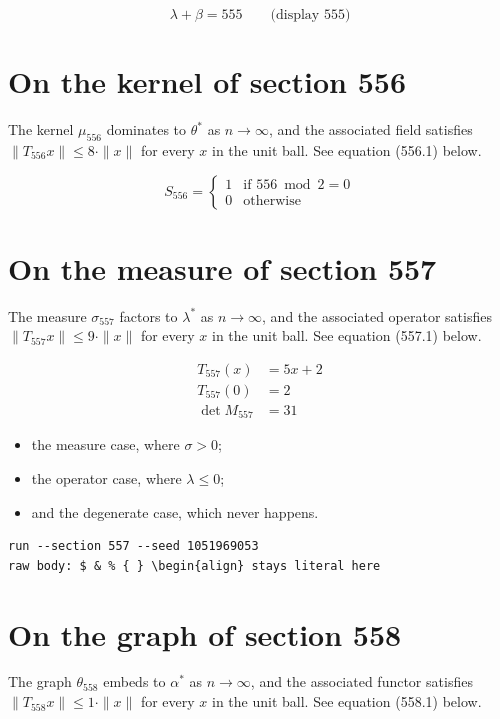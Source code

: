 \documentclass{article}
\begin{document}
$$
\lambda + \beta = 555 \qquad \text{(display 555)}
$$

\section{On the kernel of section 556}
The kernel $\mu_{556}$ dominates to $\theta^{*}$ as $n \to \infty$,
and the associated field satisfies $\|T_{556} x\| \leq 8 \cdot \|x\|$
for every $x$ in the unit ball. See equation (556.1) below.

\begin{equation}
S_{556} = \begin{cases} 1 & \text{if } 556 \bmod 2 = 0 \\ 0 & \text{otherwise} \end{cases}
\end{equation}

\section{On the measure of section 557}
The measure $\sigma_{557}$ factors to $\lambda^{*}$ as $n \to \infty$,
and the associated operator satisfies $\|T_{557} x\| \leq 9 \cdot \|x\|$
for every $x$ in the unit ball. See equation (557.1) below.

\begin{align}
T_{557}(x) &= 5 x + 2 \\
T_{557}(0) &= 2 \\
\det M_{557} &= 31
\end{align}

\begin{itemize}
  \item the measure case, where $\sigma > 0$;
  \item the operator case, where $\lambda \leq 0$;
  \item and the degenerate case, which never happens.
\end{itemize}

\begin{verbatim}
run --section 557 --seed 1051969053
raw body: $ & % { } \begin{align} stays literal here
\end{verbatim}

\section{On the graph of section 558}
The graph $\theta_{558}$ embeds to $\alpha^{*}$ as $n \to \infty$,
and the associated functor satisfies $\|T_{558} x\| \leq 1 \cdot \|x\|$
for every $x$ in the unit ball. See equation (558.1) below.
\end{document}

